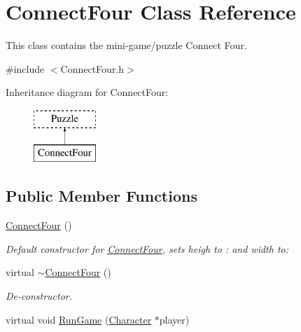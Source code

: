 \hypertarget{classConnectFour}{\section{Connect\-Four Class Reference}
\label{classConnectFour}
}


This class contains the mini-\/game/puzzle Connect Four.  




{\ttfamily \#include $<$Connect\-Four.\-h$>$}

Inheritance diagram for Connect\-Four\-:\begin{figure}[H]
\begin{center}
\leavevmode
\includegraphics[height=2.000000cm]{classConnectFour}
\end{center}
\end{figure}
\subsection*{Public Member Functions}
\begin{DoxyCompactItemize}
\item 
\hyperlink{classConnectFour_a9d7a0db424f22513386fa60ed2d5b575}{Connect\-Four} ()
\begin{DoxyCompactList}\small\item\em Default constructor for \hyperlink{classConnectFour}{Connect\-Four}, sets heigh to \-: and width to\-: \end{DoxyCompactList}\item 
virtual \hyperlink{classConnectFour_ae7d414d7f7f694fd427bfeaef80bd1f9}{$\sim$\-Connect\-Four} ()
\begin{DoxyCompactList}\small\item\em De-\/constructor. \end{DoxyCompactList}\item 
virtual void \hyperlink{classConnectFour_a3b578d1126bc575fa23b8811f121c8be}{Run\-Game} (\hyperlink{classCharacter}{Character} $\ast$player)
\end{DoxyCompactItemize}
